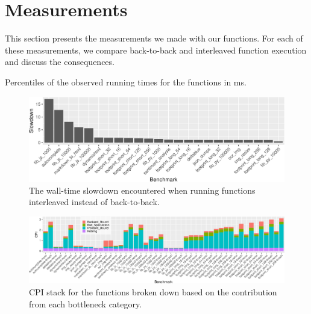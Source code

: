 \section{Measurements}
\label{wosc:sec:measurements}

This section presents the measurements we made with our functions. %
For each of these measurements, we compare back-to-back and interleaved function execution and discuss the consequences.
\begin{table}
  \caption{\label{wosc:tab:timings} Percentiles of the observed running times for the functions in ms.}
  \centering
  
\end{table}


\begin{figure}
  \centering
  \includegraphics[width=\textwidth]{figures/thrasher_speedups.pdf}
  \caption{\label{wosc:fig:slowdown} The wall-time slowdown encountered when running functions interleaved instead of back-to-back.}
\end{figure}

\begin{figure}
  \centering
  \includegraphics[width=\textwidth]{figures/topdown_level1.pdf}
  \caption{\label{wosc:fig:topdown_level1} CPI stack for the functions broken down based on the contribution from each bottleneck category.}
\end{figure}



